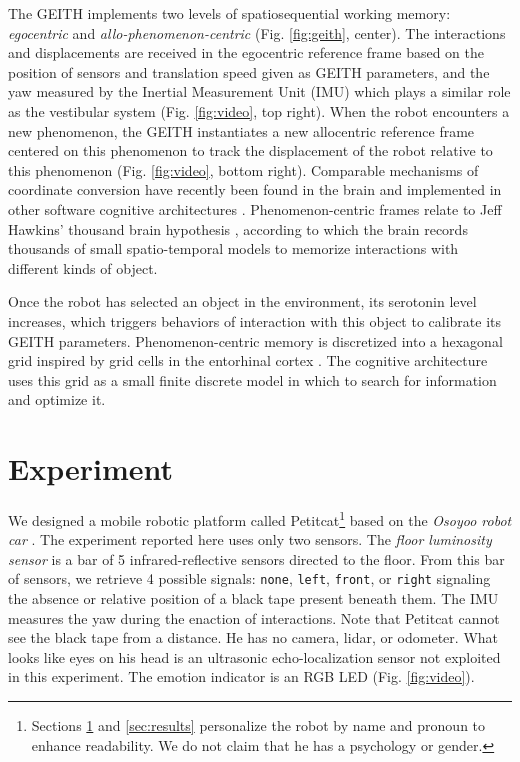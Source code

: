 \documentclass[runningheads]{llncs}
\begin{document}
The GEITH implements two levels of spatiosequential working memory: \textit{egocentric} and \textit{allo-phenomenon-centric} (Fig. \ref{fig:geith}, center).  
The interactions and displacements are received in the egocentric reference frame based on the position of sensors and translation speed given as GEITH parameters, and the yaw measured by the Inertial Measurement Unit (IMU) which plays a similar role as the vestibular system (Fig. \ref{fig:video}, top right).
When the robot encounters a new phenomenon, the GEITH instantiates a new allocentric reference frame centered on this phenomenon to track the displacement of the robot relative to this phenomenon (Fig. \ref{fig:video}, bottom right). 
Comparable mechanisms of coordinate conversion have recently been found in the brain \cite{wang_egocentric_2020} and implemented in other software cognitive architectures \cite{schneider_emergence_2024}. 
Phenomenon-centric frames relate to Jeff Hawkins' thousand brain hypothesis \cite{hawkins_framework_2019}, according to which the brain records thousands of small spatio-temporal models to memorize interactions with different kinds of object.


Once the robot has selected an object in the environment, its serotonin level increases, which triggers behaviors of interaction with this object to calibrate its GEITH parameters. 
Phenomenon-centric memory is discretized into a hexagonal grid inspired by grid cells in the entorhinal cortex \cite{moser_place_2008}. 
The cognitive architecture uses this grid as a small finite discrete model in which to search for information and optimize it. %


\section{Experiment}
\label{sec:expe}

We designed a mobile robotic platform called Petitcat\footnote{Sections \ref{sec:expe} and \ref{sec:results} personalize the robot by name and pronoun to enhance readability. We do not claim that he has a psychology or gender.} based on the \textit{Osoyoo robot car} \cite{osoyoo_robot_car}.
The experiment reported here uses only two sensors.
The \textit{floor luminosity sensor} is a bar of 5 infrared-reflective sensors directed to the floor.
From this bar of sensors, we retrieve 4 possible signals:  \texttt{none},  \texttt{left},  \texttt{front}, or \texttt{right} signaling the absence or relative position of a black tape present beneath them.  
The IMU measures the yaw during the enaction of interactions.
Note that Petitcat cannot see the black tape from a distance. 
He has no camera, lidar, or odometer.
What looks like eyes on his head is an ultrasonic echo-localization sensor not exploited in this experiment. 
The emotion indicator is an RGB LED (Fig. \ref{fig:video}). 
\end{document}
